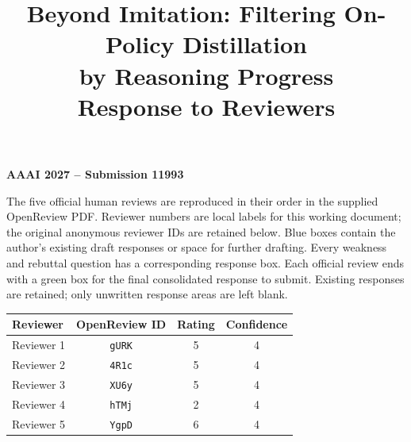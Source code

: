 \documentclass[11pt,a4paper]{article}
\title{\Large Beyond Imitation: Filtering On-Policy Distillation\\
by Reasoning Progress\\[0.65em]
\LARGE Response to Reviewers}
\author{}
\date{}
\begin{document}
\maketitle
\thispagestyle{fancy}

\textbf{AAAI 2027 -- Submission 11993}

The five official human reviews are reproduced in their order in the supplied
OpenReview PDF. Reviewer numbers are local labels for this working document;
the original anonymous reviewer IDs are retained below.
Blue boxes contain the author's existing draft responses or space for further
drafting. Every weakness and rebuttal question has a corresponding response box.
Each official review ends with a green box for the final consolidated response
to submit. Existing responses are retained; only unwritten response areas are
left blank.

\begin{center}
\begin{tabular}{lccc}
\hline
Reviewer & OpenReview ID & Rating & Confidence \\
\hline
Reviewer 1 & \texttt{gURK} & 5 & 4 \\
Reviewer 2 & \texttt{4R1c} & 5 & 4 \\
Reviewer 3 & \texttt{XU6y} & 5 & 4 \\
Reviewer 4 & \texttt{hTMj} & 2 & 4 \\
Reviewer 5 & \texttt{YgpD} & 6 & 4 \\
\hline
\end{tabular}
\end{center}

\tableofcontents

\clearpage

\clearpage

\clearpage

\clearpage

\clearpage


% 
\end{document}
